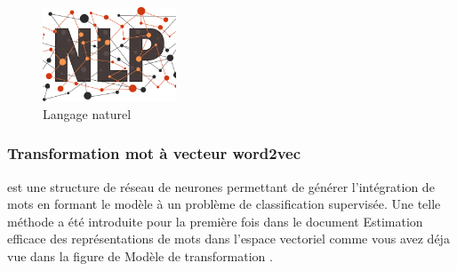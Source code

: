 \documentclass[12pt]{report}
\begin{document}
\begin{figure}[h]
\begin{center}
\includegraphics[width=150]{nnnp.jpg}
\caption{Langage naturel}
\end{center}



\end{figure}


\subsubsection{Transformation mot à vecteur word2vec}
est une structure de réseau de neurones permettant de générer l'intégration de mots en formant le modèle à un problème de classification supervisée. Une telle méthode a été introduite pour la première fois dans le document Estimation efficace des représentations de mots dans l'espace vectoriel  comme vous avez  déja vue dans la figure de Modèle de transformation \cite{ref27}.

\newpage 
\end{document}
